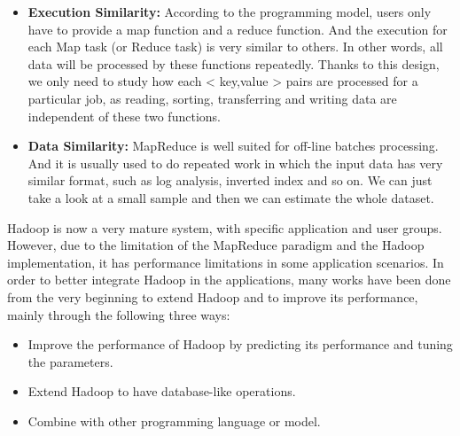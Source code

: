 \documentclass[	DIV=calc,%
							paper=a4,%
							fontsize=11pt,%
							twocolumn]{scrartcl}	 					%
\begin{document}
\begin{itemize}

\item \textbf{Execution Similarity:} According to the programming model, users only have to provide a map function and a reduce function. And the execution for each Map task (or Reduce task) is very similar to others. In other words, all data will be processed by these functions repeatedly. Thanks to this design, we only need to study how each < key,value > pairs are processed for a particular job, as reading, sorting, transferring and writing data are independent of these two functions.

\item \textbf{Data Similarity:} MapReduce is well suited for off-line batches processing. And it is usually used to do repeated work in which the input data has very similar format, such as log analysis, inverted index and so on. We can just take a look at a small sample and then we can estimate the whole dataset.


\end{itemize}


Hadoop is now a very mature system, with specific application and user groups. However, due to the limitation of the MapReduce paradigm and the Hadoop implementation, it has performance limitations in some application scenarios. In order to better integrate Hadoop in the applications, many works have been done from the very beginning to extend Hadoop and to improve its performance, mainly through the following three ways:

\begin{itemize}

\item Improve the performance of Hadoop by predicting its performance and tuning the parameters.

\item Extend Hadoop to have database-like operations.

\item Combine with other programming language or model.

\end{itemize}
\end{document}
